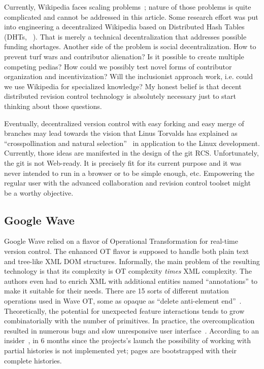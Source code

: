 \documentclass{sig-alternate}
\begin{document}
Currently, Wikipedia faces scaling problems~\cite{wp-decay,no-singularity}; nature of those problems is quite complicated and cannot be addressed in this article.
Some research effort was put into engineering a decentralized Wikipedia based on Distributed Hash Tables (DHTs, ~\cite{urdaneta}).
That is merely a technical decentralization that addresses possible funding shortages.
Another side of the problem is social decentralization.
How to prevent turf wars and contributor alienation?
Is it possible to create multiple competing pedias?
How could we possibly test novel forms of contributor organization and incentivization?
Will the inclusionist approach work, i.e. could we use Wikipedia for specialized knowledge?
My honest belief is that decent distributed revision control technology is absolutely necessary just to start thinking about those questions.

Eventually, decentralized version control with easy forking and easy merge of branches may lead towards the vision that Linus Torvalds has explained as ``crosspollination and natural selection''~\cite{linus-pollinates} in application to the Linux development.
Currently, those ideas are manifested in the design of the git RCS.
Unfortunately, the git is not Web-ready.
It is precisely fit for its current purpose and it was never intended to run in a browser or to be simple enough, etc.
Empowering the regular user with the advanced collaboration and revision control toolset might be a worthy objective.


\subsection{Google Wave}  \label{sec:waveot}

Google Wave relied on a flavor of Operational Transformation for
real-time version control. The enhanced OT flavor is supposed to
handle both plain text and tree-like XML DOM structures.
Informally, the main problem of the resulting technology is that
its complexity is OT complexity \emph{times} XML complexity. 
The authors even had to enrich XML with additional entities 
named ``annotations'' to make it suitable for their needs.
There are 15 sorts of different mutation operations used in Wave
OT, some as opaque as ``delete anti-element end''~\cite{waveot}.
Theoretically, the potential for unexpected feature interactions
tends to grow combinatorially with the number of primitives.
In practice, the overcomplication resulted in numerous bugs and
slow unresponsive user interface~\cite{own-experience}.
According to an insider~\cite{gerasimov}, in 6 months since the
projects's launch the possibility of working with partial
histories is not  implemented yet; pages are bootstrapped with
their complete histories. 
\end{document}
